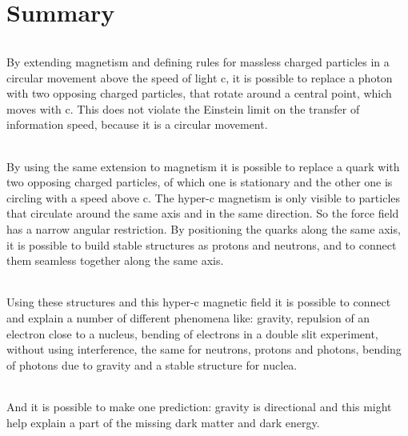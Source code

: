 \chapter{Summary}

\subparagraph{}
By extending magnetism and defining rules for massless charged particles in a circular movement above the speed of light c, it is possible to replace a photon with two opposing charged particles, that rotate around a central point, which moves with c. This does not violate the Einstein limit on the transfer of information speed, because it is a circular movement.
\subparagraph{}
By using the same extension to magnetism it is possible to replace a quark with two opposing charged particles, of which one is stationary and the other one is circling with a speed above c. The hyper-c magnetism is only visible to particles that circulate around the same axis and in the same direction. So the force field has a narrow angular restriction.
By positioning the quarks along the same axis, it is possible to build stable structures as protons and neutrons, and to connect them seamless together along the same axis. 
\subparagraph{}
Using these structures and this hyper-c magnetic field it is possible to connect and explain a number of different phenomena like: 
gravity,
repulsion of an electron close to a nucleus,
bending of electrons in a double slit experiment,
without using interference,
the same for neutrons, protons and photons,
bending of photons due to gravity and a stable structure for nuclea.
\subparagraph{}
And it is possible to make one prediction:
gravity is directional and this might help explain
a part of the missing dark matter and dark energy.

